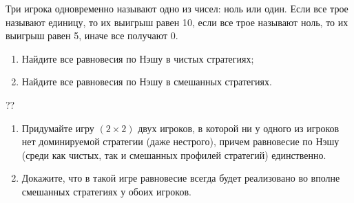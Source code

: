 \begin{problem}
Три игрока одновременно называют одно из чисел: ноль или один. Если все трое называют единицу, то их выигрыш равен 10, если все трое называют ноль, то их выигрыш равен 5, иначе все получают 0.\par
\begin{enumerate}
\item 	Найдите все равновесия по Нэшу в чистых стратегиях;\par
\item 	Найдите все равновесия по Нэшу в смешанных стратегиях.
\end{enumerate}


\begin{sol}

\end{sol}
\end{problem}



\begin{problem}
\begin{source}
\cite{polisci:lectures}??
\end{source}
 \begin{enumerate} \item Придумайте игру  $\left(2\times 2\right)$  двух игроков, в которой ни у одного из игроков нет доминируемой стратегии (даже нестрого), причем равновесие по Нэшу (среди как чистых, так и смешанных профилей стратегий)  единственно.\par
\item 	Докажите, что в такой игре равновесие всегда будет реализовано во вполне смешанных стратегиях у обоих игроков.
\end{enumerate}


\begin{sol}

\end{sol}
\end{problem}



